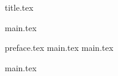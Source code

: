 



{title.tex}

\clearpage
\setcounter{page}{2}

{main.tex}

\tableofcontents
\thispagestyle{empty}

\clearpage
\pagestyle{fancy}

\clearpage

{preface.tex}
{main.tex}
{main.tex}

\clearpage
{}
{}
\renewcommand\bibname{Перелік посилань}


{main.tex}


